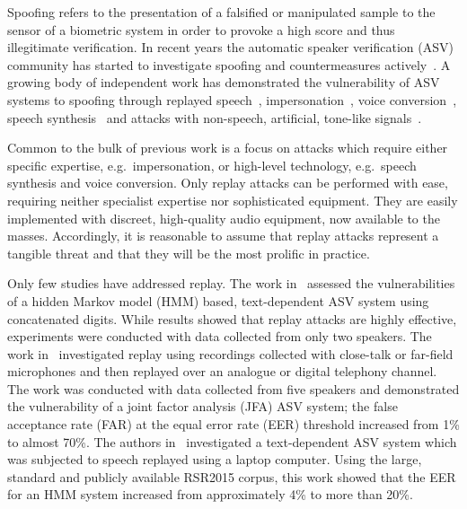 
Spoofing refers to the presentation of a falsified or manipulated sample 
to the sensor of a biometric system in order to provoke a high score and 
thus illegitimate verification.
In recent years the automatic speaker verification (ASV) community has 
started to investigate spoofing and countermeasures 
actively~\cite{interspeechSpecialSession, Wu2014a}. 
A growing 
body of independent work has demonstrated the vulnerability of ASV 
systems to spoofing through 
replayed speech~\cite{Lindberg1999,Villalba2010},
impersonation~\cite{Blomberg2004,Farrus2008}, voice 
conversion~\cite{Perrot2005, Pellom1999}, speech 
synthesis~\cite{Masuko1999, Leon2010} and attacks with non-speech, 
artificial, tone-like signals~\cite{Alegre2012a,Alegre2012b}.

Common to the bulk of previous work is a focus on attacks 
which require either specific expertise, e.g.~impersonation, or high-level 
technology, e.g.~speech synthesis and voice conversion. 
Only replay attacks can be performed with ease, requiring neither specialist 
expertise nor sophisticated equipment.  They are easily 
implemented %
with discreet, high-quality audio equipment, now available to the masses.
Accordingly, it is reasonable to assume that replay attacks represent a tangible threat and that they will be the most prolific
in practice.  
%

Only few studies have addressed replay.  
The work in~\cite{Lindberg1999} assessed the vulnerabilities of a hidden Markov model (HMM) based, text-dependent ASV system using concatenated digits.  
While results showed that replay attacks are highly effective, experiments were conducted with data collected from only two speakers.
The work in~\cite{Villalba2010} investigated replay using recordings collected with close-talk or far-field microphones and then replayed over an analogue or digital telephony channel. 
The work was conducted with data collected from five speakers and demonstrated the vulnerability of a joint factor analysis (JFA) ASV system; the false acceptance rate (FAR) at the equal error rate (EER) threshold increased from 1\% to almost 70\%. 
The authors in~\cite{Wu2014} investigated a text-dependent 
ASV system which was subjected to speech replayed using a laptop computer. 
Using the large, standard and publicly available RSR2015 corpus, this work showed that the EER for an HMM system increased from approximately 4\% to more than 20\%. %

